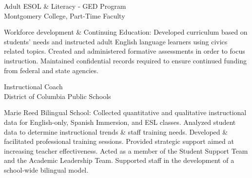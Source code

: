 \documentclass[]{scrartcl}
\begin{document}
\begin{cleanCV}
{Adult ESOL \& Literacy - GED Program}
{\\Montgomery College, Part-Time Faculty}

\JobDesc
{Workforce development \& Continuing Education: }
{Developed curriculum based on students' needs and instructed adult English language learners using civics related topics. Created and administered formative assessments in order to focus instruction. Maintained confidential records required to ensure continued funding from federal and state agencies.}


{Instructional Coach}
{\\District of Columbia Public Schools}

\JobDesc
{Marie Reed Bilingual School: }
{Collected quantitative and qualitative instructional data for English-only, Spanish Immersion, and ESL classes. Analyzed student data to determine instructional trends \& staff training needs. Developed \& facilitated professional training sessions. Provided strategic support aimed at increasing teacher effectiveness. Acted as a member of the  Student Support Team and the Academic Leadership Team. Supported staff in the development of a school-wide bilingual model.}





  



\end{cleanCV}
\end{document}

